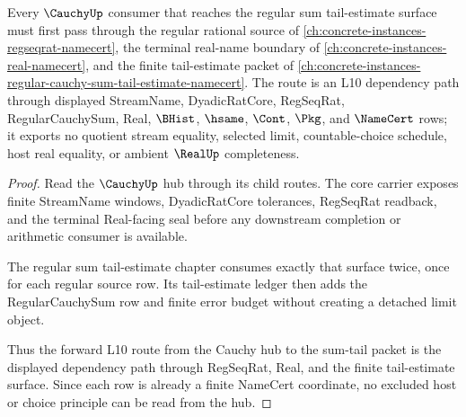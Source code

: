 \begin{theorem}
\label{thm:cauchy-base-forward-l10-route}
Every $\CauchyUp$ consumer that reaches the regular sum tail-estimate surface must first pass through the regular rational source of \autoref{ch:concrete-instances-regseqrat-namecert}, the terminal real-name boundary of \autoref{ch:concrete-instances-real-namecert}, and the finite tail-estimate packet of \autoref{ch:concrete-instances-regular-cauchy-sum-tail-estimate-namecert}. The route is an L10 dependency path through displayed StreamName, DyadicRatCore, RegSeqRat, RegularCauchySum, Real, $\BHist$, $\hsame$, $\Cont$, $\Pkg$, and $\NameCert$ rows; it exports no quotient stream equality, selected limit, countable-choice schedule, host real equality, or ambient $\RealUp$ completeness.
\end{theorem}
\begin{proof}
Read the $\CauchyUp$ hub through its child routes. The core carrier exposes finite StreamName windows, DyadicRatCore tolerances, RegSeqRat readback, and the terminal Real-facing seal before any downstream completion or arithmetic consumer is available.

The regular sum tail-estimate chapter consumes exactly that surface twice, once for each regular source row. Its tail-estimate ledger then adds the RegularCauchySum row and finite error budget without creating a detached limit object.

Thus the forward L10 route from the Cauchy hub to the sum-tail packet is the displayed dependency path through RegSeqRat, Real, and the finite tail-estimate surface. Since each row is already a finite NameCert coordinate, no excluded host or choice principle can be read from the hub.
\end{proof}
